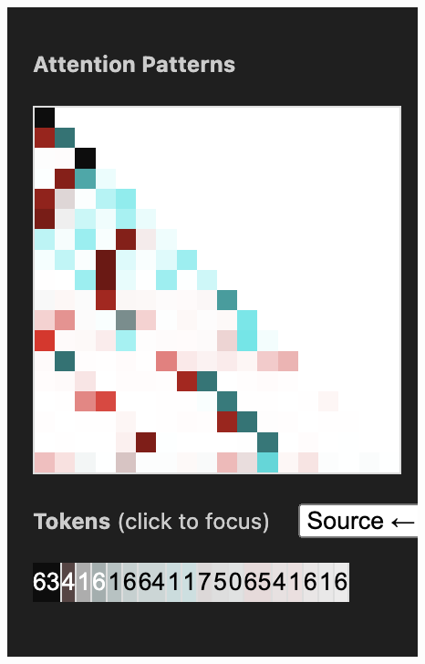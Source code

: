 \documentclass{article}
\begin{document}
\begin{center}
    \includegraphics[scale=0.4]{images/att_encoding_2hd2.png}

\end{center}
\end{document}

